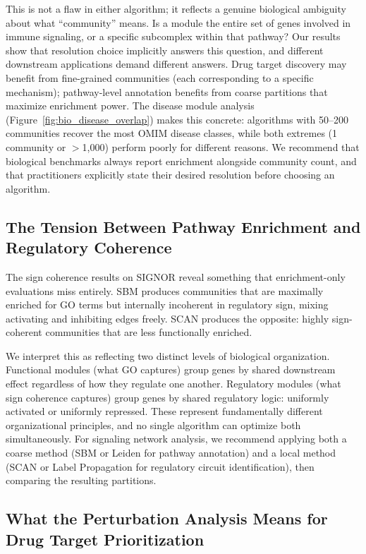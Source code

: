 \documentclass[11pt]{article}
\begin{document}
This is not a flaw in either algorithm; it reflects a genuine biological ambiguity about what ``community'' means.
Is a module the entire set of genes involved in immune signaling, or a specific subcomplex within that pathway?
Our results show that resolution choice implicitly answers this question, and different downstream applications demand different answers.
Drug target discovery may benefit from fine-grained communities (each corresponding to a specific mechanism); pathway-level annotation benefits from coarse partitions that maximize enrichment power.
The disease module analysis (Figure~\ref{fig:bio_disease_overlap}) makes this concrete: algorithms with 50--200 communities recover the most OMIM disease classes, while both extremes (1 community or $>$1{,}000) perform poorly for different reasons.
We recommend that biological benchmarks always report enrichment alongside community count, and that practitioners explicitly state their desired resolution before choosing an algorithm.

\subsection{The Tension Between Pathway Enrichment and Regulatory Coherence}

The sign coherence results on SIGNOR reveal something that enrichment-only evaluations miss entirely.
SBM produces communities that are maximally enriched for GO terms but internally incoherent in regulatory sign, mixing activating and inhibiting edges freely.
SCAN produces the opposite: highly sign-coherent communities that are less functionally enriched.

We interpret this as reflecting two distinct levels of biological organization.
Functional modules (what GO captures) group genes by shared downstream effect regardless of how they regulate one another.
Regulatory modules (what sign coherence captures) group genes by shared regulatory logic: uniformly activated or uniformly repressed.
These represent fundamentally different organizational principles, and no single algorithm can optimize both simultaneously.
For signaling network analysis, we recommend applying both a coarse method (SBM or Leiden for pathway annotation) and a local method (SCAN or Label Propagation for regulatory circuit identification), then comparing the resulting partitions.

\subsection{What the Perturbation Analysis Means for Drug Target Prioritization}
\end{document}
